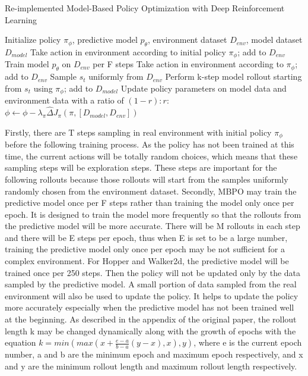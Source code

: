 \begin{algorithm}
\caption{Re-implemented Model-Based Policy Optimization with Deep Reinforcement Learning}\label{euclid}
\begin{algorithmic}[1]
\State Initialize policy $\pi_{\phi}$, predictive model $p_{\theta}$, environment dataset $D_{env}$, model dataset $D_{model}$
\State Take action in environment according to initial policy $\pi_{\phi}$; add to $D_{env}$
\EndFor
{}
\State Train model $p_{\theta}$ on $D_{env}$ per F steps
\State Take action in environment according to $\pi_{\phi}$; add to $D_{env}$
\State Sample $s_{t}$ uniformly from $D_{env}$
\State Perform k-step model rollout starting from $s_{t}$ using $\pi_{\phi}$; add to $D_{model}$
\EndFor
{}
\State Update policy parameters on model data and environment data with a ratio of $(1 - r) : r$: $\phi \leftarrow \phi - \lambda_{\pi} \hat{\Delta} J_{\pi}(\pi, [D_{model}, D_{env}])$
\EndFor
\EndFor
\EndFor
\end{algorithmic}
\end{algorithm}

Firstly, there are T steps sampling in real environment with initial policy $\pi_{\phi}$ before the following training process. As the policy has not been trained at this time, the current actions will be totally random choices, which means that these sampling steps will be exploration steps. These steps are important for the following rollouts because those rollouts will start from the samples uniformly randomly chosen from the environment dataset. Secondly, MBPO may train the predictive model once per F steps rather than training the model only once per epoch. It is designed to train the model more frequently so that the rollouts from the predictive model will be more accurate. There will be M rollouts in each step and there will be E steps per epoch, thus when E is set to be a large number, training the predictive model only once per epoch may be not sufficient for a complex environment. For Hopper and Walker2d, the predictive model will be trained once per 250 steps. Then the policy will not be updated only by the data sampled by the predictive model. A small portion of data sampled from the real environment will also be used to update the policy. It helps to update the policy more accurately especially when the predictive model has not been trained well at the beginning. As described in the appendix of the original paper, the rollout length k may be changed dynamically along with the growth of epochs with the equation $k = min(max(x + \frac{e-a}{b-a}(y-x), x), y)$, where e is the current epoch number, a and b are the minimum epoch and maximum epoch respectively, and x and y are the minimum rollout length and maximum rollout length respectively. 

